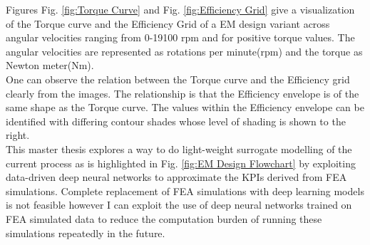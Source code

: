 \documentclass{report} %
\begin{document}
Figures Fig. \ref{fig:Torque Curve} and Fig. \ref{fig:Efficiency Grid} give a visualization of the Torque curve and the Efficiency Grid of a \ac{EM} design variant 
across angular velocities ranging from 0-19100 rpm and for positive torque values.
The angular velocities are represented as rotations per minute(rpm) and the torque as Newton meter(Nm).\\
One can observe the relation between the Torque curve and the Efficiency grid clearly from the images.
The relationship is that the Efficiency envelope is of the same shape as the Torque curve. 
The values within the Efficiency envelope can be identified with differing contour shades whose level of shading is shown to the right.\\

This master thesis explores a way to do light-weight surrogate modelling of the current process as is highlighted in Fig. \ref{fig:EM Design Flowchart} by 
exploiting data-driven deep neural networks to approximate the \ac{KPI}s derived from \ac{FEA} simulations.
Complete replacement of \ac{FEA} simulations with deep learning models is not feasible however I can exploit the use of deep neural networks 
trained on \ac{FEA} simulated data to reduce the computation burden of running these simulations repeatedly in the future.\\
\end{document}
